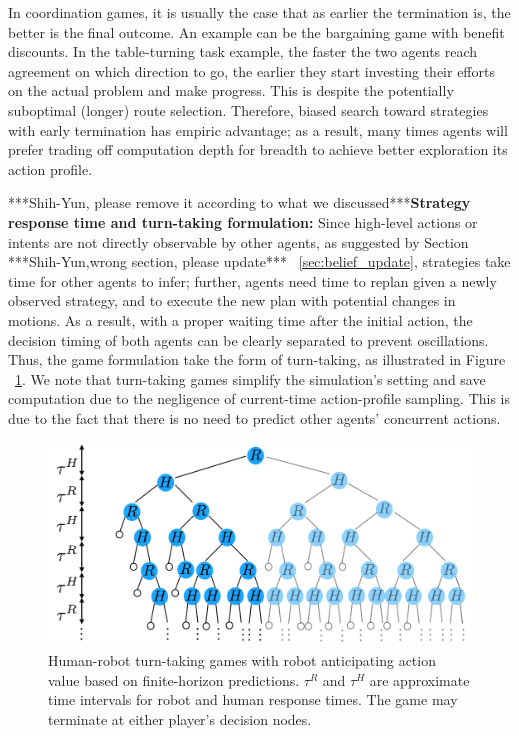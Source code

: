 \documentclass[letterpaper, 10 pt, conference]{ieeeconf}  %
\begin{document}
In coordination games, it is usually the case that as earlier the termination is, the better is the final outcome. An example can be the bargaining game with benefit discounts. 
In the table-turning task example, the faster the two agents reach 
agreement on which direction to go, the earlier they start investing their efforts on the actual problem and make progress. This is despite the 
potentially suboptimal (longer) route selection. Therefore, biased search toward strategies with early termination has empiric advantage; as a result, many times agents will prefer trading off computation depth for breadth to achieve better exploration its action profile. 

***Shih-Yun, please remove it according to what we discussed***\textbf{Strategy response time and turn-taking formulation:}
Since high-level actions or intents are not directly observable by other 
agents, as suggested by Section ***Shih-Yun,wrong section, please update*** ~\ref{sec:belief_update}, strategies take time 
for other agents to infer; further, agents need time to replan given a newly observed strategy, and to execute the new plan with potential changes in motions. As a result, with a proper waiting time after the initial action, the decision timing of both agents can be clearly separated to prevent oscillations. Thus, the game formulation take the form of turn-taking, as illustrated in Figure ~\ref{fig:turn_taking}. 
We note that turn-taking games simplify the simulation's setting and save computation due to the negligence of current-time action-profile sampling. This is due to the fact that there is no need to predict other agents' concurrent actions. 
\begin{figure}[t]
      \centering
      \vspace{-1em}
      \includegraphics[scale=0.2]{turn_taking}
      \vspace{-1.4em}
      \caption{
        Human-robot turn-taking games with robot anticipating action value based on finite-horizon predictions. $\tau^R$ and $\tau^H$ are approximate time intervals for robot and human response times. The game may terminate at either player's decision nodes.}
      \vspace{-1.7em}
     \label{fig:turn_taking}
\end{figure}
\end{document}
